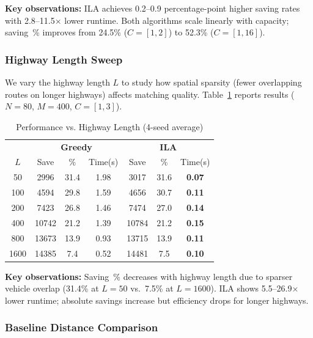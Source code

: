 \documentclass[conference]{IEEEtran}
\begin{document}
\textbf{Key observations:} ILA achieves 0.2--0.9 percentage-point higher saving rates with 2.8--11.5$\times$ lower runtime. Both algorithms scale linearly with capacity; saving~\% improves from 24.5\% ($C\!=\![1,2]$) to 52.3\% ($C\!=\![1,16]$).

\subsubsection{Highway Length Sweep}
We vary the highway length $L$ to study how spatial sparsity (fewer overlapping routes on longer highways) affects matching quality.
Table~\ref{tab:length} reports results ($N=80$, $M=400$, $C=[1,3]$).

\begin{table}[htbp]
\caption{Performance vs. Highway Length (4-seed average)}
\label{tab:length}
\centering
\begin{tabular}{c|ccc|ccc}
\toprule
& \multicolumn{3}{c|}{\textbf{Greedy}} & \multicolumn{3}{c}{\textbf{ILA}} \\
$L$ & Save & \% & Time(s) & Save & \% & Time(s) \\
\midrule
50 & 2996 & 31.4 & 1.98 & 3017 & 31.6 & \textbf{0.07} \\
100 & 4594 & 29.8 & 1.59 & 4656 & 30.7 & \textbf{0.11} \\
200 & 7423 & 26.8 & 1.46 & 7474 & 27.0 & \textbf{0.14} \\
400 & 10742 & 21.2 & 1.39 & 10784 & 21.2 & \textbf{0.15} \\
800 & 13673 & 13.9 & 0.93 & 13715 & 13.9 & \textbf{0.11} \\
1600 & 14385 & 7.4 & 0.52 & 14481 & 7.5 & \textbf{0.10} \\
\bottomrule
\end{tabular}
\end{table}

\textbf{Key observations:} Saving~\% decreases with highway length due to sparser vehicle overlap (31.4\% at $L\!=\!50$ vs.\ 7.5\% at $L\!=\!1600$). ILA shows 5.5--26.9$\times$ lower runtime; absolute savings increase but efficiency drops for longer highways.

\subsubsection{Baseline Distance Comparison}
\end{document}
